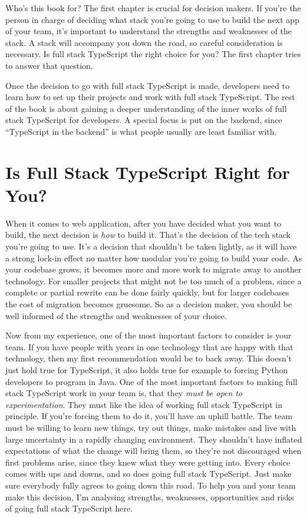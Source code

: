 \documentclass[12pt,a4paper]{report}
\begin{document}
Who's this book for? The first chapter is crucial for decision makers. If you're the person in charge of deciding what stack you're going to use to build the next app of your team, it's important to understand the strengths and weaknesses of the stack. A stack will accompany you down the road, so careful consideration is necessary. Is full stack TypeScript the right choice for you? The first chapter tries to answer that question.

Once the decision to go with full stack TypeScript is made, developers need to learn how to set up their projects and work with full stack TypeScript. The rest of the book is about gaining a deeper understanding of the inner works of full stack TypeScript for developers. A special focus is put on the backend, since ``TypeScript in the backend'' is what people usually are least familiar with.

\chapter{Is Full Stack TypeScript Right for You?}

When it comes to web application, after you have decided what you want to build, the next decision is \textit{how} to build it. That's the decision of the tech stack you're going to use. It's a decision that shouldn't be taken lightly, as it will have a strong lock-in effect no matter how modular you're going to build your code. As your codebase grows, it becomes more and more work to migrate away to another technology. For smaller projects that might not be too much of a problem, since a complete or partial rewrite can be done fairly quickly, but for larger codebases the cost of migration becomes gruesome. So as a decision maker, you should be well informed of the strengths and weaknesses of your choice.

Now from my experience, one of the most important factors to consider is your team. If you have people with years in one technology that are happy with that technology, then my first recommendation would be to back away. This doesn't just hold true for TypeScript, it also holds true for example to forcing Python developers to program in Java. One of the most important factors to making full stack TypeScript work in your team is, that they \textit{must be open to experimentation}. They must like the idea of working full stack TypeScript in principle. If you're forcing them to do it, you'll have an uphill battle. The team must be willing to learn new things, try out things, make mistakes and live with large uncertainty in a rapidly changing environment. They shouldn't have inflated expectations of what the change will bring them, so they're not discouraged when first problems arise, since they knew what they were getting into. Every choice comes with ups and downs, and so does going full stack TypeScript. Just make sure everybody fully agrees to going down this road. To help you and your team make this decision, I'm analysing strengths, weaknesses, opportunities and risks of going full stack TypeScript here.
\end{document}
